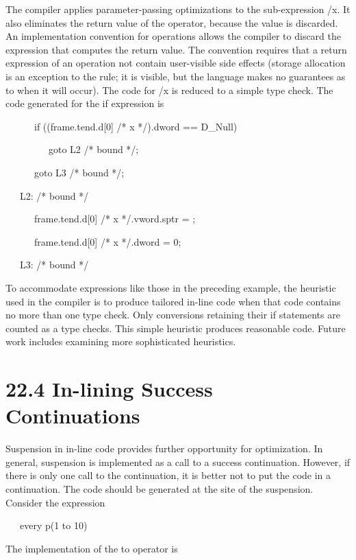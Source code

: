 The compiler applies parameter-passing optimizations to the
sub-expression /x. It also eliminates the return value of the
operator, because the value is discarded. An implementation convention
for operations allows the compiler to discard the expression that
computes the return value. The convention requires that a return
expression of an operation not contain user-visible side effects
(storage allocation is an exception to the rule; it is visible, but
the language makes no guarantees as to when it will occur). The code
for /x is reduced to a simple type check. The code generated for the
if expression is

{\ttfamily\mdseries
\ \ \ \ \ \ if ((frame.tend.d[0] /* x */).dword == D\_Null)}

{\ttfamily\mdseries
\ \ \ \ \ \ \ \ \ goto L2 /* bound */;}

{\ttfamily\mdseries
\ \ \ \ \ \ goto L3 /* bound */;}

{\ttfamily\mdseries
\ \ \ L2: /* bound */}

{\ttfamily\mdseries
\ \ \ \ \ \ frame.tend.d[0] /* x */.vword.sptr = ;}

{\ttfamily\mdseries
\ \ \ \ \ \ frame.tend.d[0] /* x */.dword = 0;}

{\ttfamily\mdseries
\ \ \ L3: /* bound */}


To accommodate expressions like those in the preceding example, the
heuristic used in the compiler is to produce tailored in-line code
when that code contains no more than one type check. Only conversions
retaining their if statements are counted as a type checks. This
simple heuristic produces reasonable code. Future work includes
examining more sophisticated heuristics.


\section[22.4 In-lining Success Continuations]{22.4 In-lining Success Continuations}

Suspension in in-line code provides further opportunity for
optimization. In general, suspension is implemented as a call to a
success continuation. However, if there is only one call to the
continuation, it is better not to put the code in a continuation. The
code should be generated at the site of the suspension. Consider the
expression

{\ttfamily\mdseries
\ \ \ every p(1 to 10)}


The implementation of the to operator is 

